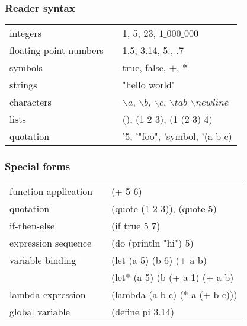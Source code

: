 \documentclass{beamer}
\begin{document}
	\begin{frame}
		\frametitle{Reader syntax}

		\begin{tabular}{lcl}
			integers               & & 1, 5, 23, $1\_000\_000$                                                               \\[9pt]
			floating point numbers & & 1.5, 3.14, 5., .7                                                                     \\[9pt]
			symbols                & & true, false, $+$, $*$                                                                 \\[9pt]
			strings                & & "hello world"                                                                         \\[9pt]
			characters             & & $\backslash a$, $\backslash b$, $\backslash c$, $\backslash tab$ $\backslash newline$ \\[9pt]
			lists                  & & (), (1 2 3), (1 (2 3) 4)                                                              \\[9pt]
			quotation              & & '5, '"foo", 'symbol, '(a b c)                                                         \\[9pt]
		\end{tabular}
	\end{frame}

	\begin{frame}
		\frametitle{Special forms}

		\begin{tabular}{lcl}
			function application  & & (+ 5 6)                        \\[9pt]
			quotation             & & (quote (1 2 3)), (quote 5)     \\[9pt]
			if-then-else          & & (if true 5 7)                  \\[9pt]
			expression sequence   & & (do (println "hi") 5)          \\[9pt]
			variable binding      & & (let  (a 5) (b 6)      (+ a b) \\[9pt]
			                      & & (let* (a 5) (b (+ a 1) (+ a b) \\[9pt]
			lambda expression     & & (lambda (a b c) (* a (+ b c))) \\[9pt]
			global variable       & & (define pi 3.14)               \\[9pt]
		\end{tabular}

	\end{frame}
\end{document}
